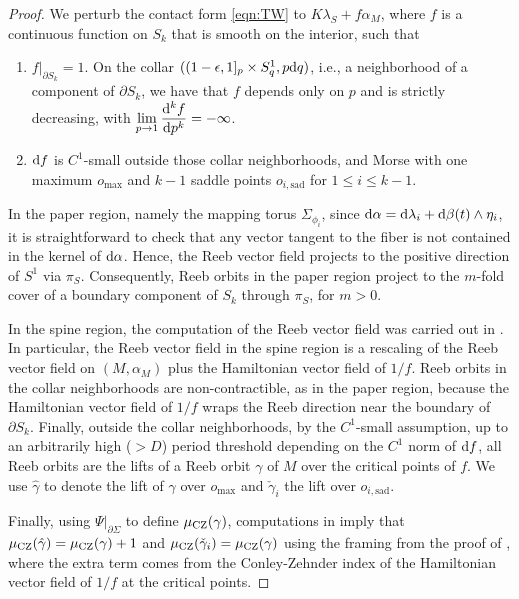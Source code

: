 \documentclass[11pt]{amsart}
\numberwithin{equation}{section}
\def\rd{{\rm d}}
\def\CZ{\rm CZ}
\begin{document}
\begin{proof}
    We perturb the contact form \eqref{eqn:TW} to $K\lambda_S+f\alpha_M$, where $f$ is a continuous function on $S_{k}$ that is smooth on the interior, such that
    \begin{enumerate}
        \item $f|_{\partial S_{k}}=1$. On the collar $((1-\epsilon,1]_p\times S^1_q, p\rd q)$, i.e., a neighborhood of a component of $\partial S_{k}$, we have that $f$ depends only on $p$ and is strictly decreasing, with $\displaystyle \lim_{p\to 1} \frac{\rd ^k f}{\rd p^k}=-\infty$. 
        \item $\rd f$ is $C^1$-small outside those collar neighborhoods, and Morse with one maximum $o_{\max}$ and $k-1$ saddle points $o_{i,\text{sad}}$ for $1\le i \le k-1$.
    \end{enumerate}
    In the paper region, namely the mapping torus $\Sigma_{\phi_i}$, since $\rd \alpha = \rd \lambda_{i}+\rd \beta(t) \wedge \eta_i$, it is straightforward to check that any vector tangent to the fiber is not contained in the kernel of $\rd \alpha$. Hence, the Reeb vector field projects to the positive direction of $S^1$ via $\pi_S$. Consequently, Reeb orbits in the paper region project to the $m$-fold cover of a boundary component of $S_k$ through $\pi_S$, for $m>0$. 
    
    In the spine region, the computation of the Reeb vector field was carried out in \cite[\S 6.2]{zbMATH07367119}. In particular, the Reeb vector field in the spine region is a rescaling of the Reeb vector field on $(M,\alpha_M)$ plus the Hamiltonian vector field of $1/f$. Reeb orbits in the collar neighborhoods are non-contractible, as in the paper region, because the Hamiltonian vector field of $1/f$ wraps the Reeb direction near the boundary of $\partial S_k$. Finally, outside the collar neighborhoods, by the $C^1$-small assumption, up to an arbitrarily high ($>D$) period threshold depending on the $C^1$ norm of $\rd f$, all Reeb orbits are the lifts of a Reeb orbit $\gamma$ of $M$ over the critical points of $f$. We use $\hat{\gamma}$ to denote the lift of $\gamma$ over $o_{\max}$ and $\check{\gamma}_i$ the lift over $o_{i,\text{sad}}$. 

    Finally, using $\Psi|_{\partial \Sigma}$ to define $\mu_{\CZ}(\gamma)$, computations in \cite[\S 6.2]{zbMATH07367119} imply that $\mu_{\CZ}(\hat{\gamma})=\mu_{\CZ}(\gamma)+1$ and $\mu_{\CZ}(\check{\gamma}_i)=\mu_{\CZ}(\gamma)$ using the framing from the proof of , where the extra term comes from the Conley-Zehnder index of the Hamiltonian vector field of $1/f$ at the critical points. 
\end{proof}
\end{document}
